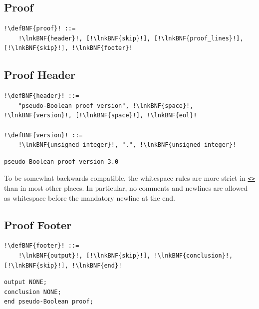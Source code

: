 \documentclass[a4paper]{article}
\newcommand{\defBNF}[1]{\hypertarget{def:#1}{<\detokenize{#1}>}}
\newcommand{\lnkBNF}[1]{\hyperlink{def:#1}{<\detokenize{#1}>}}
\begin{document}
\subsection{Proof}\label{sec:proof}
\begin{lstlisting}
!\defBNF{proof}! ::=
	!\lnkBNF{header}!, [!\lnkBNF{skip}!], [!\lnkBNF{proof_lines}!], [!\lnkBNF{skip}!], !\lnkBNF{footer}!
\end{lstlisting}


\subsection{Proof Header}\label{sec:header}
\begin{lstlisting}
!\defBNF{header}! ::=
	"pseudo-Boolean proof version", !\lnkBNF{space}!, !\lnkBNF{version}!, [!\lnkBNF{space}!], !\lnkBNF{eol}!

!\defBNF{version}! ::=
	!\lnkBNF{unsigned_integer}!, ".", !\lnkBNF{unsigned_integer}!
\end{lstlisting}
\begin{lstlisting}[language=veripb]
pseudo-Boolean proof version 3.0
\end{lstlisting}
To be somewhat backwards compatible, the whitespace rules are more strict in \texttt{\lnkBNF{header}} than in most other places. In particular, no comments and newlines are allowed as whitespace before the mandatory newline at the end.


\subsection{Proof Footer}\label{sec:footer}
\begin{lstlisting}
!\defBNF{footer}! ::=
	!\lnkBNF{output}!, [!\lnkBNF{skip}!], !\lnkBNF{conclusion}!, [!\lnkBNF{skip}!], !\lnkBNF{end}!
\end{lstlisting}
\begin{lstlisting}[language=veripb]
output NONE;
conclusion NONE;
end pseudo-Boolean proof;
\end{lstlisting}
\end{document}

